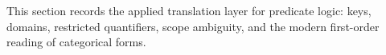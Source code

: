 \begin{remark*}[Exposition]
This section records the applied translation layer for predicate logic: keys,
domains, restricted quantifiers, scope ambiguity, and the modern first-order
reading of categorical forms.
\end{remark*}

